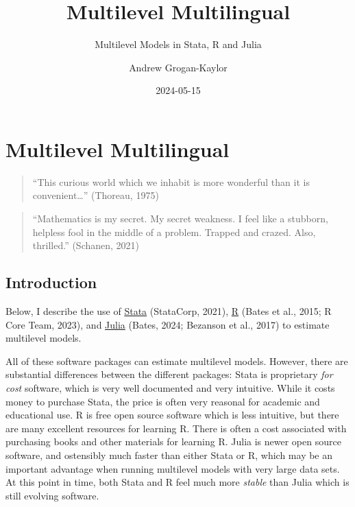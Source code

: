 \documentclass[
  letterpaper,
  DIV=11,
  numbers=noendperiod]{scrreprt}
\title{Multilevel Multilingual}
\subtitle{Multilevel Models in Stata, R and Julia}
\author{Andrew Grogan-Kaylor}
\date{2024-05-15}
\renewcommand*\contentsname{Table of contents}
\newcommand\contentsname{Table of contents}
\begin{document}
\maketitle

\renewcommand*\contentsname{Table of contents}
{
\hypersetup{linkcolor=}
\setcounter{tocdepth}{2}
\tableofcontents
}
\listoftables
{}

\chapter{Multilevel Multilingual}\label{multilevel-multilingual}

\begin{quote}
``This curious world which we inhabit is more wonderful than it is
convenient\ldots{}'' (Thoreau, 1975)
\end{quote}

\begin{quote}
``Mathematics is my secret. My secret weakness. I feel like a stubborn,
helpless fool in the middle of a problem. Trapped and crazed. Also,
thrilled.'' (Schanen, 2021)
\end{quote}

\section{Introduction}\label{introduction}

Below, I describe the use of \href{https://www.stata.com/}{Stata}
(StataCorp, 2021), \href{https://www.r-project.org/}{R} (Bates et al.,
2015; R Core Team, 2023), and \href{https://www.julialang.org/}{Julia}
(Bates, 2024; Bezanson et al., 2017) to estimate multilevel models.

All of these software packages can estimate multilevel models. However,
there are substantial differences between the different packages: Stata
is proprietary \emph{for cost} software, which is very well documented
and very intuitive. While it costs money to purchase Stata, the price is
often very reasonal for academic and educational use. R is free open
source software which is less intuitive, but there are many excellent
resources for learning R. There is often a cost associated with
purchasing books and other materials for learning R. Julia is newer open
source software, and ostensibly much faster than either Stata or R,
which may be an important advantage when running multilevel models with
very large data sets. At this point in time, both Stata and R feel much
more \emph{stable} than Julia which is still evolving software.
\end{document}

